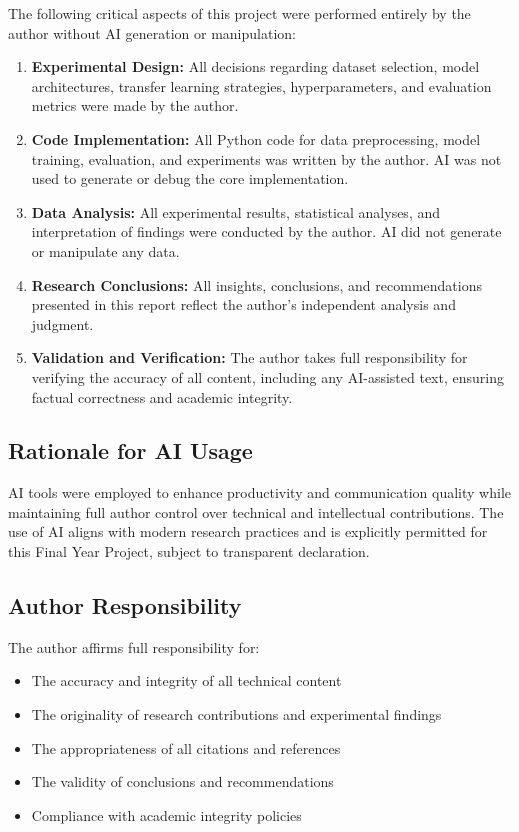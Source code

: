 \documentclass[12pt,a4paper]{report}
\begin{document}
The following critical aspects of this project were performed entirely by the author without AI generation or manipulation:

\begin{enumerate}
    \item \textbf{Experimental Design:} All decisions regarding dataset selection, model architectures, transfer learning strategies, hyperparameters, and evaluation metrics were made by the author.
    
    \item \textbf{Code Implementation:} All Python code for data preprocessing, model training, evaluation, and experiments was written by the author. AI was not used to generate or debug the core implementation.
    
    \item \textbf{Data Analysis:} All experimental results, statistical analyses, and interpretation of findings were conducted by the author. AI did not generate or manipulate any data.
    
    \item \textbf{Research Conclusions:} All insights, conclusions, and recommendations presented in this report reflect the author's independent analysis and judgment.
    
    \item \textbf{Validation and Verification:} The author takes full responsibility for verifying the accuracy of all content, including any AI-assisted text, ensuring factual correctness and academic integrity.
\end{enumerate}

\subsection{Rationale for AI Usage}

AI tools were employed to enhance productivity and communication quality while maintaining full author control over technical and intellectual contributions. The use of AI aligns with modern research practices and is explicitly permitted for this Final Year Project, subject to transparent declaration.

\subsection{Author Responsibility}

The author affirms full responsibility for:
\begin{itemize}
    \item The accuracy and integrity of all technical content
    \item The originality of research contributions and experimental findings
    \item The appropriateness of all citations and references
    \item The validity of conclusions and recommendations
    \item Compliance with academic integrity policies
\end{itemize}
\end{document}
